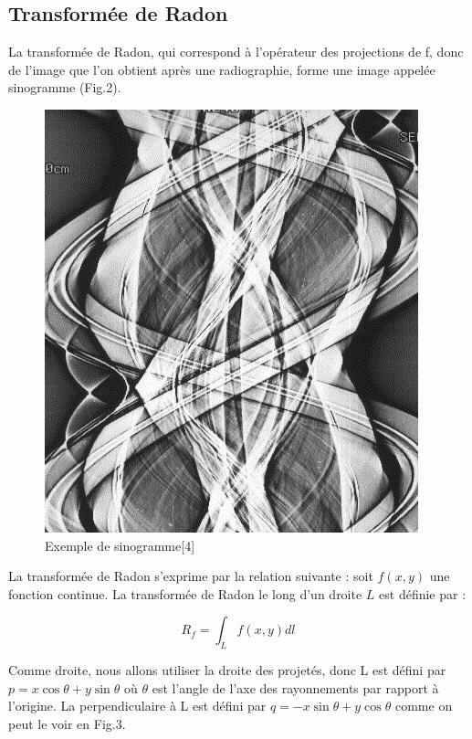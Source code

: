 \documentclass[conference]{IEEEtran}
\begin{document}
\subsection{Transformée de Radon}

La transformée de Radon, qui correspond à l'opérateur des projections de f, donc de l'image que l'on obtient après une radiographie, forme une image appelée sinogramme (Fig.2). 

\begin{figure}[H]
\centering
\includegraphics[scale=0.4]{sinogrammeExemple}
\caption[Exemple de sinogramme]{Exemple de sinogramme[4]}
\label{fig:gallery}
\end{figure}

La transformée de Radon s'exprime par la relation suivante :
soit $f(x,y)$ une fonction continue. La transformée de Radon le long d'un droite $L$ est définie par :

\[R_f = \int_L f(x,y)dl \]

Comme droite, nous allons utiliser la droite des projetés, donc L est défini par $p=x\cos\theta + y\sin\theta$ où $\theta$ est l'angle de l'axe des rayonnements par rapport à l'origine. La perpendiculaire à L est défini par $q=-x\sin\theta+y\cos\theta$ comme on peut le voir en Fig.3.
\end{document}
